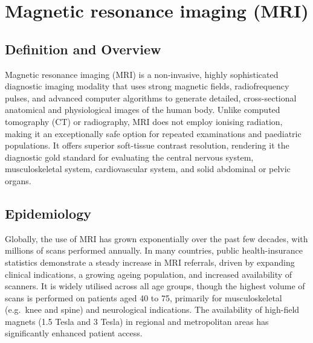 \chapter{Magnetic resonance imaging (MRI)}

\section*{Definition and Overview}
Magnetic resonance imaging (MRI) is a non-invasive, highly sophisticated diagnostic imaging modality that uses strong magnetic fields, radiofrequency pulses, and advanced computer algorithms to generate detailed, cross-sectional anatomical and physiological images of the human body. Unlike computed tomography (CT) or radiography, MRI does not employ ionising radiation, making it an exceptionally safe option for repeated examinations and paediatric populations. It offers superior soft-tissue contrast resolution, rendering it the diagnostic gold standard for evaluating the central nervous system, musculoskeletal system, cardiovascular system, and solid abdominal or pelvic organs.

\section*{Epidemiology}
Globally, the use of MRI has grown exponentially over the past few decades, with millions of scans performed annually. In many countries, public health-insurance statistics demonstrate a steady increase in MRI referrals, driven by expanding clinical indications, a growing ageing population, and increased availability of scanners. It is widely utilised across all age groups, though the highest volume of scans is performed on patients aged 40 to 75, primarily for musculoskeletal (e.g.\ knee and spine) and neurological indications. The availability of high-field magnets (1.5 Tesla and 3 Tesla) in regional and metropolitan areas has significantly enhanced patient access.

